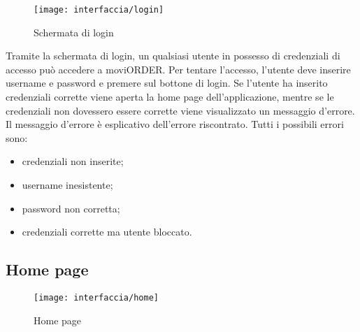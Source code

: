 \begin{figure}[!h] 
    \centering 
    \texttt{[image: interfaccia/login]} 
    \caption{Schermata di login}
\end{figure}

Tramite la schermata di login, un qualsiasi utente in possesso di credenziali di accesso può accedere a moviORDER. Per tentare l'accesso, l'utente deve inserire username e password e premere sul bottone di login. Se l'utente ha inserito credenziali corrette viene aperta la home page dell'applicazione, mentre se le credenziali non dovessero essere corrette viene visualizzato un messaggio d'errore. Il messaggio d'errore è esplicativo dell'errore riscontrato. Tutti i possibili errori sono:
\begin{itemize}
	\item credenziali non inserite;
	\item username inesistente;
	\item password non corretta;
	\item credenziali corrette ma utente bloccato.
\end{itemize}

\subsection{Home page}

\begin{figure}[!h] 
    \centering 
    \texttt{[image: interfaccia/home]} 
    \caption{Home page}
\end{figure}

